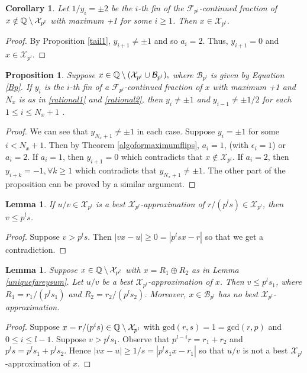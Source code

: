 \documentclass[12pt]{elsarticle}
\newtheorem{lemma}[theorem]{Lemma}
\newtheorem{corollary}[theorem]{Corollary}
\newtheorem{proposition}[theorem]{Proposition}
\theoremstyle{definition}
\newcommand{\mX}{{\mathcal X}}
\newcommand{\f}{{\mathcal F}}
\newcommand{\ep}{\epsilon}
\begin{document}
{  		\begin{corollary}\label{tail2} 
  			 Let  $1/y_i=\pm2$ be the $i$-th fin  of the $\f_{p^l}$-continued fraction of $x\notin\Q\setminus \mX_{p^l}$ with maximum +1  for some $i\ge1$. Then $x\in\mX_{p^l}$. 
  		\end{corollary}
  		\begin{proof}
  			By Proposition \ref{tail1}, $y_{i+1}\ne\pm1$ and so $a_i=2.$ Thus, $y_{i+1}=0$ and $x\in\mX_{p^l}$. 
  		\end{proof}
  	
  		\begin{proposition}\label{rationalwithfareysum}
  			Suppose $x\in \Q\setminus(\mX_{p^l}\cup \mathcal{B}_{p^l}),$ where $\mathcal{B}_{p^l}$ is given by Equation \eqref{Bp}. 
  			If $y_i$ is the $i$-th fin of a  $\f_{p^l}$-continued fraction of $x$ with maximum +1  and $N_x$ is as in \eqref{rational1} and \eqref{rational2}, then  $y_i\neq\pm1$ and $y_{i-1}\ne\pm1/2$ for each $1\le  i\le N_x+1$ .
  			\end{proposition}
  			\begin{proof}We can see that $y_{N_x+1}\ne\pm1$ in each case.	Suppose $y_i=\pm1$ for some $i< N_x+1$. Then by Theorem \ref{algoformaximumflips}, $a_i=1$, (with $\ep_i=1$)  or $a_i=2$. If $a_i=1$, then $y_{i+1}=0$ which contradicts that $x\not\in\mX_{p^l}$. If $a_i=2$, then $y_{i+k}=-1, \forall k\ge1$  which contradicts that $y_{N_x+1}\neq\pm1$. The other part of the proposition can be proved by a similar argument.
  			\end{proof}
  	
  		
  		\begin{lemma}\label{bestappX} 
  			If $u/v\in\mX_{p^l}$ is  a best $\mX_{p^l}$-approximation of $r/(p^ls)\in\mX_{p^l}$, then $v\le p^ls$.
  		\end{lemma}
  		\begin{proof}
  			Suppose $v>p^ls$. Then $|vx-u|\ge0=|p^ls x-r|$ so that we get a contradiction. 
  		\end{proof}
  		\begin{lemma}\label{noapproximation}
  			Suppose $x\in \Q\setminus\mX_{p^l}$ with $x=R_1\oplus R_2$ as in Lemma \ref{uniquefareysum}. Let $u/v$ be a best $\mX_{p^l}$-approximation of $x$. Then $v\le p^ls_1$, where $R_1=r_1/(p^ls_1)$ and $R_2=r_2/(p^ls_2)$. Moreover, $x\in\mathcal{B}_{p^l}$ has no best $\mX_{p^l}$-approximation.
  		\end{lemma}	
  		\begin{proof} Suppose $x=r/(p^is)\in \Q\setminus\mX_{p^l}$ with $\mathrm{gcd}(r,s)=1=\mathrm{gcd}(r,p)$ and $0\le i\le l-1.$ 
  			Suppose $v>p^ls_1$. Observe that $p^{l-i}r={r_1+r_2}$ and $p^ls={p^ls_1+p^ls_2}$. Hence $|vx-u|\geq1/s=|p^ls_1 x-r_1|$ so that $u/v$ is not a best $\mX_{p^l}$-approximation of $x$.
  			

\end{proof}}
\end{document}
